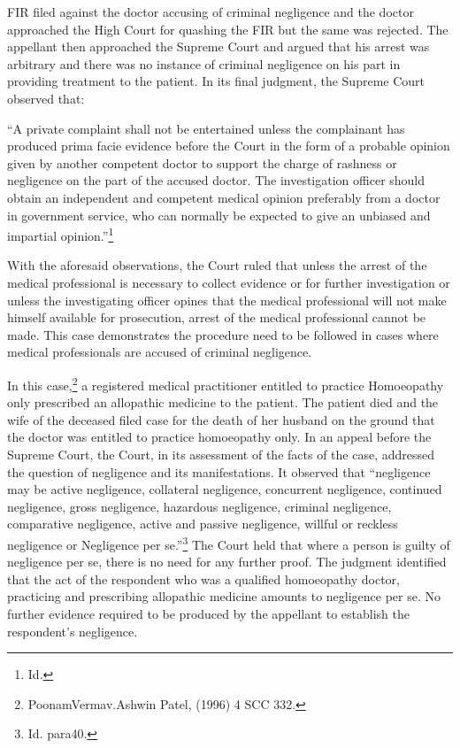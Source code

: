 \begin{multicols}{2}
\vspace{-.1cm}

\noi
FIR filed against the doctor accusing of criminal negligence and the doctor approached the High
Court for quashing the FIR but the same was rejected. The appellant then approached the Supreme
Court and argued that his arrest was arbitrary and there was no instance of criminal negligence
on his part in providing treatment to the patient. In its final judgment, the Supreme Court observed
that:

\vspace{-.1cm}

\noi
“A private complaint shall not be entertained unless the complainant has produced prima facie
evidence before the Court in the form of a probable opinion given by another competent doctor
to support the charge of rashness or negligence on the part of the accused doctor. The investigation
officer should obtain an independent and competent medical opinion preferably from a doctor in
government service, who can normally be expected to give an unbiased and impartial opinion.”\footnote{Id.}

\vspace{-.1cm}

\noi
With the aforesaid observations, the Court ruled that unless the arrest of the medical professional
is necessary to collect evidence or for further investigation or unless the investigating officer
opines that the medical professional will not make himself available for prosecution, arrest of the
medical professional cannot be made. This case demonstrates the procedure need to be followed
in cases where medical professionals are accused of criminal negligence.

\vspace{-.1cm}


\vspace{-.1cm}

\noi
In this case,\footnote{PoonamVermav.Ashwin Patel, (1996) 4 SCC 332.} a registered medical practitioner entitled to practice Homoeopathy only prescribed
an allopathic medicine to the patient. The patient died and the wife of the deceased filed case for
the death of her husband on the ground that the doctor was entitled to practice homoeopathy only.
In an appeal before the Supreme Court, the Court, in its assessment of the facts of the case,
addressed the question of negligence and its manifestations. It observed that “negligence may be
active negligence, collateral negligence, concurrent negligence, continued negligence, gross
negligence, hazardous negligence, criminal negligence, comparative negligence, active and
passive negligence, willful or reckless negligence or Negligence per se.”\footnote{Id. para40.} The Court held that
where a person is guilty of negligence per se, there is no need for any further proof. The judgment
identified that the act of the respondent who was a qualified homoeopathy doctor, practicing and
prescribing allopathic medicine amounts to negligence per se. No further evidence required to be
produced by the appellant to establish the respondent’s negligence.


\end{multicols}
